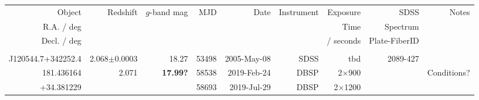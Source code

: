 \documentclass[a4paper,fleqn,usenatbib]{mnras}
\begin{document}
\begin{table}
  \centering
  \begin{tabular}{r  r  r r r   r r r r}
    \hline 
    \hline 
    Object                           & \multirow{3}{*}{Redshift}  & \multirow{3}{*}{$g$-band mag}      & \multirow{3}{*}{MJD} & \multirow{3}{*}{Date}  & \multirow{3}{*}{Instrument}  & Exposure      & SDSS                        & \multirow{3}{*}{Notes} \\
    R.A. / deg                     &                                         &                                                          &                                 &                                   &                                               &  Time           & Spectrum                 & \\
    Decl. / deg                   &                                         &                                                          &                                &                                     &                                              &  / seconds    & Plate-FiberID  & \\
    \hline  
                                         &                                         &                        &               &                            &                    &                             &                              & \\
    J120544.7+342252.4   & 2.068$\pm$0.0003         &   18.27             &  53498   &  2005-May-08   & SDSS             & tbd                          & 2089-427             & \\
    181.436164                  & 2.071                              & {\bf 17.99?}     &  58538   &  2019-Feb-24    & DBSP            &  2$\times$900    &                               &  Conditions? \\
    +34.381229                 &                                        &                          &  58693   &  2019-Jul-29     & DBSP            &  2$\times$1200   &                              &   \\

\end{tabular}
\end{table}
\end{document}
